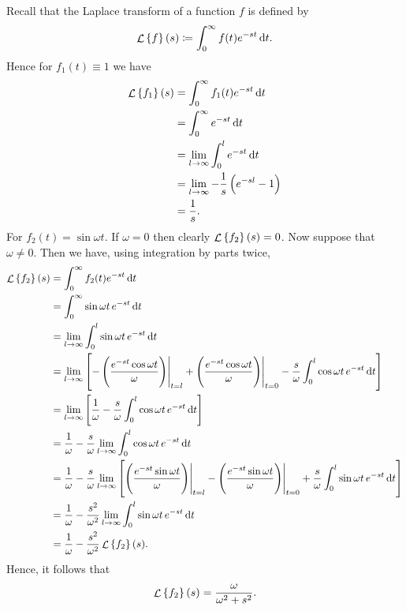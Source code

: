 \documentclass{article}
\DeclareMathOperator{\Lagr}{\mathcal{L}}
\begin{document}
Recall that the Laplace transform of a function $f$ is defined by
%
\begin{equation*}
    \Lagr \cbr{f}(s) \coloneqq \int_0^\infty f(t) e^{-s t} \dif t
    .
\end{equation*}
%
Hence for $f_1(t) \equiv 1$ we have
%
\begin{align*}
    \Lagr \cbr{f_1}(s)
        &= \int_0^\infty f_1(t) e^{-s t} \dif t \\
        &= \int_0^\infty e^{-s t} \dif t \\
        &= \lim_{l \to \infty} \int_0^l e^{-s t} \dif t \\
        &= \lim_{l \to \infty} - \frac{1}{s} \del{e^{-s l} - 1} \\
        &= \frac{1}{s}
        .
\end{align*}
%
For $f_2(t) = \sin \omega t$. If $\omega = 0$ then clearly $\Lagr
\cbr{f_2}(s) = 0$. Now suppose that $\omega \neq 0$. Then we have, using
integration by parts twice,
%
\begin{align*}
    \Lagr \cbr{f_2}(s)
        &= \int_0^\infty f_2(t) e^{-s t} \dif t \\
        &= \int_0^\infty \sin \omega t \, e^{-s t} \dif t \\
        &= \lim_{l \to \infty} \int_0^l \sin \omega t \, e^{-s t} \dif t \\
        &= \lim_{l \to \infty}
            \sbr{
                - \eval{\del{\frac{e^{-s t} \cos \omega t}{\omega}}}_{t=l}
                + \eval{\del{\frac{e^{-s t} \cos \omega t}{\omega}}}_{t=0}
                - \frac{s}{\omega} \int_0^l \cos \omega t \, e^{-s t} \dif t
            } \\
        &= \lim_{l \to \infty}
            \sbr{
                \frac{1}{\omega}
                - \frac{s}{\omega} \int_0^l \cos \omega t \, e^{-s t} \dif t
            } \\
        &= \frac{1}{\omega}
            - \frac{s}{\omega} \lim_{l \to \infty} \int_0^l \cos \omega t \, e^{-s t} \dif t \\
        &= \frac{1}{\omega}
            - \frac{s}{\omega} \lim_{l \to \infty} \sbr{
                \eval{\del{\frac{e^{-s t} \sin \omega t}{\omega}}}_{t=l}
                - \eval{\del{\frac{e^{-s t} \sin \omega t}{\omega}}}_{t=0}
                + \frac{s}{\omega} \int_0^l \sin \omega t \, e^{-s t} \dif t
            } \\
        &= \frac{1}{\omega}
            - \frac{s^2}{\omega^2} \lim_{l \to \infty} \int_0^l \sin \omega t \, e^{-s t} \dif t \\
        &= \frac{1}{\omega} - \frac{s^2}{\omega^2} \Lagr \cbr{f_2}(s)
        .
\end{align*}
%
Hence, it follows that
%
\begin{equation*}
    \Lagr \cbr{f_2}(s)
        = \frac{\omega}{\omega^2 + s^2}
        .
\end{equation*}
\end{document}

